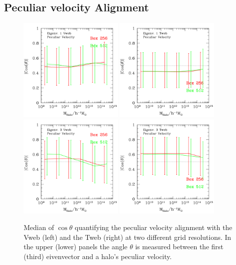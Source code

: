 \documentclass[usenatbib]{mn2e}
\begin{document}
\subsection{Peculiar velocity Alignment}

\begin{figure}
\includegraphics[width=0.45\textwidth]{../plot2/Mass/vVWeb.pdf}
\includegraphics[width=0.45\textwidth]{../plot2/Mass/vTWeb.pdf}
\includegraphics[width=0.45\textwidth]{../plot2/Mass/vVWebV2.pdf}
\includegraphics[width=0.45\textwidth]{../plot2/Mass/vTWebV2.pdf}
\caption{Median of $\cos\theta$ quantifying the peculiar velocity
  alignment with the Vweb (left) and the Tweb (right) at two different
  grid resolutions. In the upper (lower)  panels the angle $\theta$ is
  measured between the first (third) eivenvector and a halo's peculiar
  velocity.} 
\end{figure}
\end{document}
